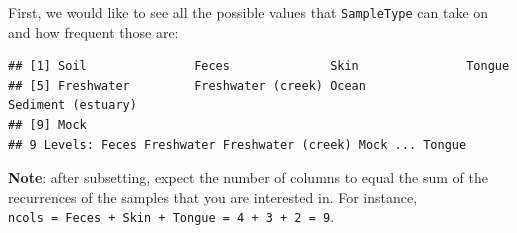 \documentclass[
]{book}
\newenvironment{Shaded}{\begin{snugshade}}{\end{snugshade}}
\newcommand{\CommentTok}[1]{\textcolor[rgb]{0.56,0.35,0.01}{\textit{#1}}}
\newcommand{\FunctionTok}[1]{\textcolor[rgb]{0.00,0.00,0.00}{#1}}
\newcommand{\NormalTok}[1]{#1}
\newcommand{\SpecialCharTok}[1]{\textcolor[rgb]{0.00,0.00,0.00}{#1}}
\begin{document}
First, we would like to see all the possible values that \texttt{SampleType} can take on and how frequent those are:

\begin{Shaded}
\end{Shaded}

\begin{verbatim}
## [1] Soil               Feces              Skin               Tongue            
## [5] Freshwater         Freshwater (creek) Ocean              Sediment (estuary)
## [9] Mock              
## 9 Levels: Feces Freshwater Freshwater (creek) Mock ... Tongue
\end{verbatim}

\begin{Shaded}
\end{Shaded}

\begin{table}
\centering
{}
\end{table}

\textbf{Note}: after subsetting, expect the number of columns to equal the
sum of the recurrences of the samples that you are interested
in. For instance, \texttt{ncols\ =\ Feces\ +\ Skin\ +\ Tongue\ =\ 4\ +\ 3\ +\ 2\ =\ 9}.
\end{document}
